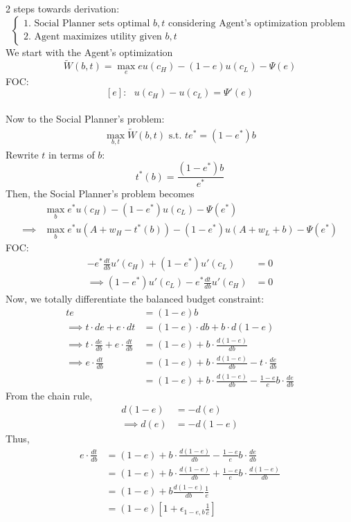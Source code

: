 \documentclass[
]{article}
\begin{document}
2 steps towards derivation:
\[\begin{cases} 1. \text{ Social Planner sets optimal } b, t \text{ considering Agent's optimization problem} \\
2. \text{ Agent maximizes utility given }b, t \end{cases}\] We start
with the Agent's optimization
\[\tilde{W}(b,t) = \max _e eu(c_H) - (1-e)u(c_L) - \Psi(e)\] FOC:
\[[e]: \text{  } u(c_H) - u(c_L) = \Psi'(e)\]\\
Now to the Social Planner's problem: \[\begin{aligned} 
\max_{b,t} \tilde{W}(b,t) \text{  s.t. } te^* = (1-e^*)b
\end{aligned}\] Rewrite \(t\) in terms of \(b\):
\[t^* (b) = \frac{(1-e^*)b}{e^*}\] Then, the Social Planner's problem
becomes \[\begin{aligned} 
&\max_{b} e^*u(c_H) - (1-e^*)u(c_L) - \Psi(e^*) \\
\implies &\max_b e^*u(A + w_H - t^*(b)) - (1-e^*)u(A + w_L + b) - \Psi(e^*) 
\end{aligned}\] FOC: \begin{align*} 
-e^* \frac{dt}{db}u'(c_H) + (1-e^*)u'(c_L) &= 0 \\
\implies (1-e^*)u'(c_L) -e^* \frac{dt}{db}u'(c_H) &= 0 \tag{$\star$}
\end{align*} Now, we totally differentiate the balanced budget
constraint: \[\begin{aligned} 
te &= (1-e)b \\
\implies t \cdot de + e \cdot dt &= (1-e) \cdot db + b  \cdot d(1-e)  \\
\implies t\cdot \frac{de}{db} +e\cdot \frac{dt}{db} &= (1-e) + b\cdot \frac{d(1-e)}{db} \\
\implies e\cdot \frac{dt}{db} &= (1-e) + b\cdot \frac{d(1-e)}{db} - t\cdot \frac{de}{db}  \\
&=(1-e) + b\cdot \frac{d(1-e)}{db} -\frac{1-e}{e}b\cdot \frac{de}{db}
\end{aligned}\] From the chain rule, \[\begin{aligned}
d(1-e) &= - d(e) \\
\implies d(e) &= - d(1-e)
\end{aligned}\] Thus, \[\begin{aligned}
e\cdot \frac{dt}{db} &=(1-e) + b\cdot \frac{d(1-e)}{db} -\frac{1-e}{e}b\cdot \frac{de}{db} \\
&=(1-e) + b\cdot \frac{d(1-e)}{db} +\frac{1-e}{e}b\cdot \frac{d(1-e)}{db} \\
&=(1-e) + b \frac{d(1-e)}{db}\frac{1}{e} \\
&=(1-e)[1 + \epsilon_{1-e, b}\frac{1}{e}]
\end{aligned}\]
\end{document}
